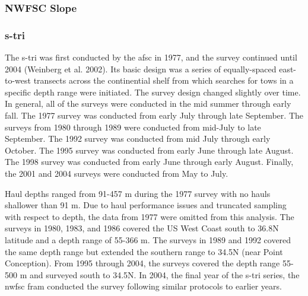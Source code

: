 \documentclass[11pt,
  english,
  a4paper,
]{article}
\begin{document}

\hypertarget{nwfsc-slope}{%
\subsubsection{NWFSC Slope}\label{nwfsc-slope}}

\leavevmode\tagmcend\tagstructend


\hypertarget{section}{%
\subsubsection{\texorpdfstring{\acrlong{s-tri}}{}}\label{section}}

\leavevmode\tagmcend\tagstructend


The \gls{s-tri} was first conducted by the \gls{afsc} in 1977, and the survey continued until 2004 {(Weinberg et al. 2002)\leavevmode\tagmcend\tagstructend}. Its basic design was a series of equally-spaced east-to-west transects across the continential shelf from which searches for tows in a specific depth range were initiated. The survey design changed slightly over time. In general, all of the surveys were conducted in the mid summer through early fall. The 1977 survey was conducted from early July through late September. The surveys from 1980 through 1989 were conducted from mid-July to late September. The 1992 survey was conducted from mid July through early October. The 1995 survey was conducted from early June through late August. The 1998 survey was conducted from early June through early August. Finally, the 2001 and 2004 surveys were conducted from May to July.

\leavevmode\tagmcend\tagstructend\par


Haul depths ranged from 91-457 m during the 1977 survey with no hauls shallower than 91 m. Due to haul performance issues and truncated sampling with respect to depth, the data from 1977 were omitted from this analysis. The surveys in 1980, 1983, and 1986 covered the US West Coast south to 36.8\textdegree N latitude and a depth range of 55-366 m. The surveys in 1989 and 1992 covered the same depth range but extended the southern range to 34.5\textdegree N (near Point Conception). From 1995 through 2004, the surveys covered the depth range 55-500 m and surveyed south to 34.5\textdegree N. In 2004, the final year of the \gls{s-tri} series, the \gls{nwfsc} \gls{fram} conducted the survey following similar protocols to earlier years.
\end{document}
